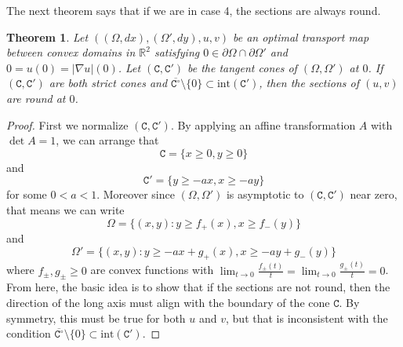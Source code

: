 \documentclass[12pt,reqno]{amsart}
\newtheorem{theorem}{Theorem}[section]
\numberwithin{equation}{section}
\begin{document}
        The next theorem says that if we are in case 4, the sections are always round. 
        \begin{theorem}\label{thm: 2D-case-4-round}
            Let $((\Omega, dx), (\Omega', dy), u, v)$ be an optimal transport map between convex domains in $\mathbb R^2$ satisfying $0\in\partial\Omega\cap\partial\Omega'$ and $0 = u(0) = |\nabla u|(0)$. Let $(\mathtt C, \mathtt C')$ be the tangent cones of $(\Omega, \Omega')$ at $0$. If $(\mathtt C, \mathtt C')$ are both strict cones and $\overline{\mathtt C^{\circ}}\setminus\{0\}\subset \text{int}(\mathtt C')$, then the sections of $(u, v)$ are round at $0$. 
        \end{theorem}
        \begin{proof}            
            First we normalize $(\mathtt C, \mathtt C')$. By applying an affine transformation $A$ with $\det A = 1$, we can arrange that \[\mathtt C = \{x\geq 0, y\geq 0\}\] 
            and 
            \[\mathtt C' = \{y\geq -ax, x\geq -ay\}\] for some $0<a<1$. 
            Moreover since $(\Omega, \Omega')$ is asymptotic to $(\mathtt C, \mathtt C')$ near zero, that means we can write 
            \[\Omega = \{(x, y): y\geq f_+(x), x\geq f_-(y)\}\]
            and
            \[\Omega' = \{(x, y):y\geq-ax+g_+(x), x\geq -ay+g_-(y)\}\]
            where $f_{\pm}, g_{\pm}\geq 0$ are convex functions with $\lim_{t\to 0}\frac{f_{\pm}(t)}{t} = \lim_{t\to 0}\frac{g_{\pm}(t)}{t} = 0$. From here, the basic idea is to show that if the sections are not round, then the direction of the long axis must align with the boundary of the cone $\mathtt C$. By symmetry, this must be true for both $u$ and $v$, but that is inconsistent with the condition $\overline{\mathtt C^{\circ}}\setminus\{0\}\subset \text{int}(\mathtt C')$. 
            

\end{proof}
\end{document}
